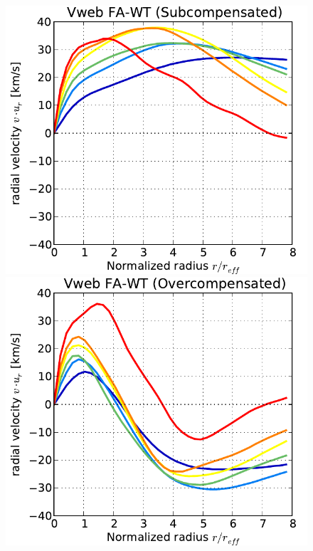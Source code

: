 \documentclass[a4,useAMS,usenatbib,usegraphicx]{mn2e}
\begin{document}
\begin{figure}
  \includegraphics[trim = 1mm 0mm 5mm 0mm, clip, keepaspectratio=true,
  width=0.32\textheight]{voids_velocity_VwebFAG0.pdf}
  \includegraphics[trim = 1mm 0mm 5mm 0mm, clip, keepaspectratio=true,
  width=0.32\textheight]{voids_velocity_VwebFAG1.pdf}
  \label{fig:velocity_profile}
  \vspace{0.1 cm}
\end{figure}
\end{document}
